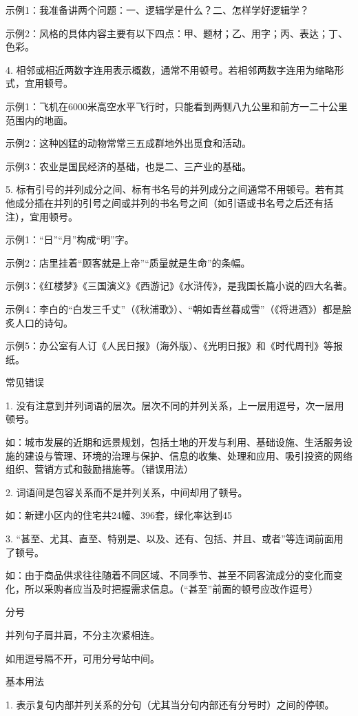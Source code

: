 示例1：我准备讲两个问题：一、逻辑学是什么？二、怎样学好逻辑学？

示例2：风格的具体内容主要有以下四点：甲、题材；乙、用字；丙、表达；丁、色彩。

4. 相邻或相近两数字连用表示概数，通常不用顿号。若相邻两数字连用为缩略形式，宜用顿号。

示例1：飞机在6000米高空水平飞行时，只能看到两侧八九公里和前方一二十公里范围内的地面。

示例2：这种凶猛的动物常常三五成群地外出觅食和活动。

示例3：农业是国民经济的基础，也是二、三产业的基础。

5. 标有引号的并列成分之间、标有书名号的并列成分之间通常不用顿号。若有其他成分插在并列的引号之间或并列的书名号之间（如引语或书名号之后还有括注），宜用顿号。

示例1：“日”“月”构成“明”字。

示例2：店里挂着“顾客就是上帝”“质量就是生命”的条幅。

示例3：《红楼梦》《三国演义》《西游记》《水浒传》，是我国长篇小说的四大名著。

示例4：李白的“白发三千丈”（《秋浦歌》）、“朝如青丝暮成雪”（《将进酒》）都是脍炙人口的诗句。

示例5：办公室有人订《人民日报》（海外版）、《光明日报》和《时代周刊》等报纸。

常见错误

1. 没有注意到并列词语的层次。层次不同的并列关系，上一层用逗号，次一层用顿号。

如：城市发展的近期和远景规划，包括土地的开发与利用、基础设施、生活服务设施的建设与管理、环境的治理与保护、信息的收集、处理和应用、吸引投资的网络组织、营销方式和鼓励措施等。（错误用法）

2. 词语间是包容关系而不是并列关系，中间却用了顿号。

如：新建小区内的住宅共24幢、396套，绿化率达到45%

3. “甚至、尤其、直至、特别是、以及、还有、包括、并且、或者”等连词前面用了顿号。

如：由于商品供求往往随着不同区域、不同季节、甚至不同客流成分的变化而变化，所以采购者应当及时把握需求信息。（“甚至”前面的顿号应改作逗号）

分号

并列句子肩并肩，不分主次紧相连。

如用逗号隔不开，可用分号站中间。

基本用法

1. 表示复句内部并列关系的分句（尤其当分句内部还有分号时）之间的停顿。

